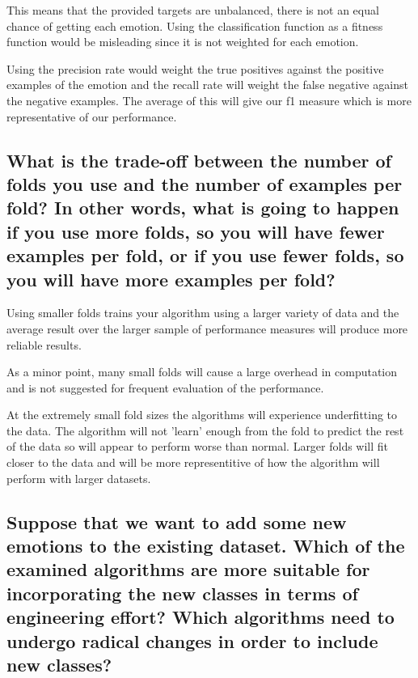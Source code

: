 \documentclass[11pt]{article}
\begin{document}
This means that the provided targets are unbalanced, there is not an equal chance of getting each emotion. Using the classification function as a fitness function would be misleading since it is not weighted for each emotion.

Using the precision rate would weight the true positives against the positive examples of the emotion and the recall rate will weight the false negative against the negative examples. The average of this will give our f1 measure which is more representative of our performance. 

\subsection{What is the trade-off between the number of folds you use and the number of examples per fold? In other words, what is going to happen if you use more folds, so you will have fewer examples per fold, or if you use fewer folds, so you will have more examples per fold?}

Using smaller folds trains your algorithm using a larger variety of data and the average result over the larger sample of performance measures will produce more reliable results.

As a minor point, many small folds will cause a large overhead in computation and is not suggested for frequent evaluation of the performance. 

At the extremely small fold sizes the algorithms will experience underfitting to the data. The algorithm will not 'learn' enough from the fold to predict the rest of the data so will appear to perform worse than normal. Larger folds will fit closer to the data and will be more representitive of how the algorithm will perform with larger datasets. 

\subsection{Suppose that we want to add some new emotions to the existing dataset. Which of the examined algorithms are more suitable for incorporating the new classes in terms of engineering effort? Which algorithms need to undergo radical changes in order to include new classes?}
\end{document}

